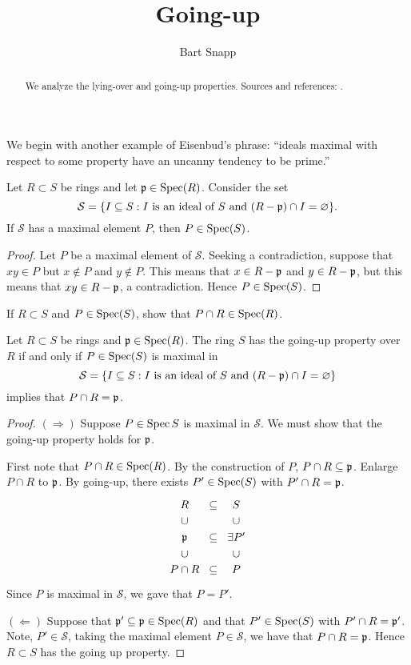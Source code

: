 \documentclass{ximera}
\author{Bart Snapp}
\title{Going-up}
\begin{document}
\begin{abstract}
  We analyze the lying-over and going-up properties. Sources and references:
  \cite{iK1974}.
\end{abstract}
\maketitle


We begin with another example of Eisenbud's phrase: ``ideals maximal
with respect to some property have an uncanny tendency to be prime.''


\begin{proposition}
  Let $R\subset S$ be rings and let $\mathfrak{p}\in\operatorname{Spec}(R)$. Consider the set
  \[
  \mathcal{S} = \{I\subseteq S: \text{$I$ is an ideal of $S$ and $(R-\mathfrak{p})\cap I = \varnothing$}\}.
  \]
  If $\mathcal{S}$ has a maximal element $P$, then $P\in\operatorname{Spec}(S)$.
  \begin{proof}
    Let $P$ be a maximal element of $\mathcal{S}$. Seeking a
    contradiction, suppose that $xy\in P$ but $x\notin P$ and $y\notin
    P$. This means that $x\in R-\mathfrak{p}$ and $y\in R-\mathfrak{p}$, but this means
    that $xy\in R-\mathfrak{p}$, a contradiction. Hence $P\in\operatorname{Spec}(S)$.
  \end{proof}
\end{proposition}

\begin{exercise}
  If $R\subset S$ and $P\in\operatorname{Spec}(S)$, show that $P\cap R\in\operatorname{Spec}(R)$.
\end{exercise}


\begin{proposition}
  Let $R\subset S$ be rings and $\mathfrak{p}\in\operatorname{Spec}(R)$. The ring $S$ has the
  going-up property over $R$ if and only if $P\in\operatorname{Spec}(S)$ is maximal in
  \[
  \mathcal{S} = \{I\subseteq S: \text{$I$ is an ideal of $S$ and
    $(R-\mathfrak{p})\cap I = \varnothing$}\}
  \]
  implies that $P\cap R = \mathfrak{p}$.
  \begin{proof}
    $(\Rightarrow)$ Suppose $P\in\operatorname{Spec}{S}$ is maximal in
    $\mathcal{S}$. We must show that the going-up property holds for
    $\mathfrak{p}$.

    First note that $P\cap R\in\operatorname{Spec}(R)$. By the construction of $P$,
    $P\cap R\subseteq \mathfrak{p}$. Enlarge $P\cap R$ to $\mathfrak{p}$.  By going-up,
    there exists $P'\in\operatorname{Spec}(S)$ with $P'\cap R = \mathfrak{p}$.
    \[
    \begin{tikzcd}[row sep=0em,column sep=0em]
      R    & \subset & S \\
      \cup &         & \cup \\
      \p & \subset & \exists P' \\
      \cup &         & \cup \\
      P\cap R & \subset & P  
    \end{tikzcd}
    \]
    Since $P$ is maximal in $\mathcal{S}$, we gave that $P=P'$.

    $(\Leftarrow)$ Suppose that $\mathfrak{p}'\subseteq\mathfrak{p}\in\operatorname{Spec}(R)$ and that
    $P'\in\operatorname{Spec}(S)$ with $P'\cap R = \mathfrak{p}'$. Note, $P'\in\mathcal{S}$,
    taking the maximal element $P\in\mathcal{S}$, we have that $P\cap
    R = \mathfrak{p}$. Hence $R\subset S$ has the going up property.
  \end{proof}
\end{proposition}
\end{document}
